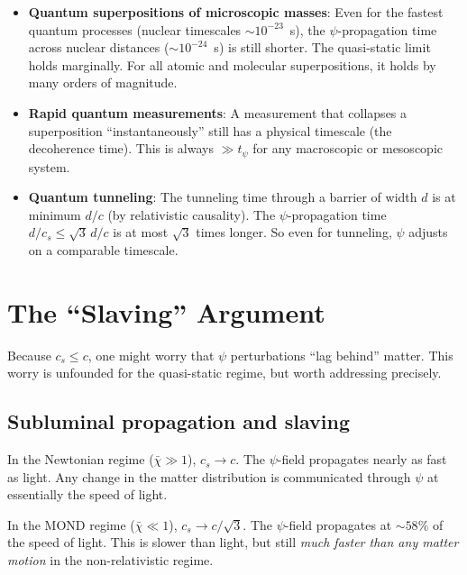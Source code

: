 \documentclass[12pt,a4paper]{article}
\begin{document}
\begin{itemize}
\item \textbf{Quantum superpositions of microscopic masses}: Even for
      the fastest quantum processes (nuclear timescales $\sim 10^{-23}$~s),
      the $\psi$-propagation time across nuclear distances ($\sim 10^{-24}$~s)
      is still shorter. The quasi-static limit holds marginally. For all
      atomic and molecular superpositions, it holds by many orders of
      magnitude.

\item \textbf{Rapid quantum measurements}: A measurement that collapses
      a superposition ``instantaneously'' still has a physical timescale
      (the decoherence time). This is always $\gg t_\psi$ for any
      macroscopic or mesoscopic system.

\item \textbf{Quantum tunneling}: The tunneling time through a barrier
      of width $d$ is at minimum $d/c$ (by relativistic causality).
      The $\psi$-propagation time $d/c_s \leq \sqrt{3}\,d/c$ is at most
      $\sqrt{3}$ times longer. So even for tunneling, $\psi$ adjusts
      on a comparable timescale.
\end{itemize}


\section{The ``Slaving'' Argument}
\label{sec:slaving}

Because $c_s \leq c$, one might worry that $\psi$ perturbations ``lag behind''
matter. This worry is unfounded for the quasi-static regime, but worth
addressing precisely.

\subsection{Subluminal propagation and slaving}

In the Newtonian regime ($\bar\chi \gg 1$), $c_s \to c$. The $\psi$-field
propagates nearly as fast as light. Any change in the matter distribution
is communicated through $\psi$ at essentially the speed of light.

In the MOND regime ($\bar\chi \ll 1$), $c_s \to c/\sqrt{3}$. The
$\psi$-field propagates at $\sim 58\%$ of the speed of light. This is
slower than light, but still \emph{much faster than any matter motion}
in the non-relativistic regime.
\end{document}
